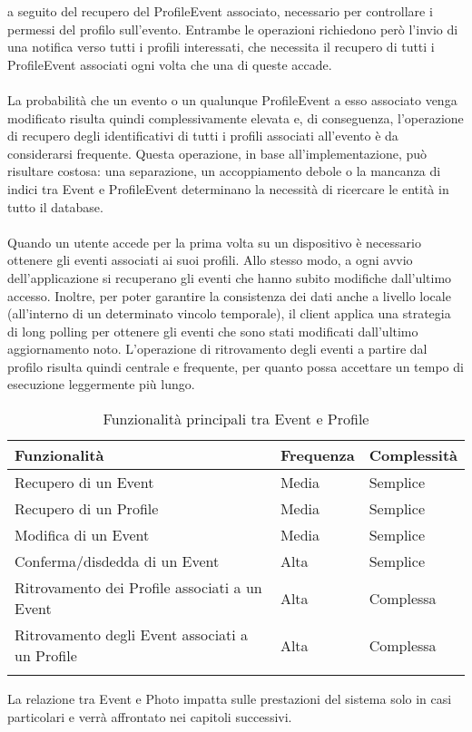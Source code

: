 a seguito del recupero del ProfileEvent associato,
necessario per controllare i permessi del profilo sull'evento.
Entrambe le operazioni richiedono però l'invio di una notifica verso tutti i profili interessati,
che necessita il recupero di tutti i ProfileEvent associati ogni volta che una di queste accade.\\
\\
La probabilità che un evento o un qualunque ProfileEvent a esso associato
venga modificato risulta quindi complessivamente elevata e, di conseguenza,
l'operazione di recupero degli identificativi di tutti i profili associati all'evento
è da considerarsi frequente.
Questa operazione, in base all'implementazione, può risultare costosa:
una separazione, un accoppiamento debole o la mancanza di indici tra Event e ProfileEvent
determinano la necessità di ricercare le entità in tutto il database.\\
\\
Quando un utente accede per la prima volta su un dispositivo
è necessario ottenere gli eventi associati ai suoi profili.
Allo stesso modo, a ogni avvio dell'applicazione si recuperano gli eventi
che hanno subito modifiche dall'ultimo accesso.
Inoltre, per poter garantire 
la consistenza dei dati anche a livello locale
(all'interno di un determinato vincolo temporale),
il client applica una strategia di long polling
per ottenere gli eventi che sono stati modificati dall'ultimo aggiornamento noto.
L'operazione di ritrovamento degli eventi a partire dal profilo risulta quindi centrale e frequente,
per quanto possa accettare un tempo di esecuzione leggermente più lungo. \\

\begin{longtable}{|P{9.5cm}|P{2.5cm}|P{2.5cm}|}
    \hline
    \textbf{Funzionalità}                           & \textbf{Frequenza } & \textbf{Complessità} \\
    \hline
    Recupero di un Event                            & Media               & Semplice             \\
    \hline
    Recupero di un Profile                          & Media               & Semplice             \\
    \hline
    Modifica di un Event                            & Media               & Semplice             \\
    \hline
    Conferma/disdedda di un Event                   & Alta                & Semplice             \\
    \hline
    Ritrovamento dei Profile associati a un Event   & Alta                & Complessa            \\
    \hline
    Ritrovamento degli Event associati a un Profile & Alta                & Complessa            \\
    \hline
    \caption{Funzionalità principali tra Event e Profile}
\end{longtable}

La relazione tra Event e Photo impatta sulle prestazioni del sistema solo in casi particolari e
verrà affrontato nei capitoli successivi.
\clearpage